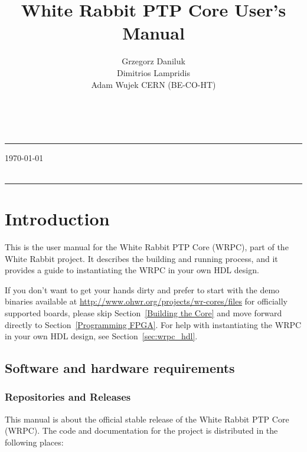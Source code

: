 \documentclass[a4paper, 12pt]{article}
\title{White Rabbit PTP Core User's Manual}
\author{Grzegorz Daniluk \\Dimitrios Lampridis \\Adam Wujek \hfill CERN (BE-CO-HT)}
\renewcommand{\_}{\underscore\allowbreak}
\begin{document}


\makeatletter
{}
\raggedright
{\LARGE\bf\@title}\\[0.2 cm]
\hrule height 4pt \vspace{0.1cm}
{\large\gitrevinfo\hfill\today}\\
\vspace*{\fill}
{\large\@author}\\
\hrule height 2pt
\justify
\makeatother

\newpage

\tableofcontents

\newpage

\section{Introduction}

This is the user manual for the White Rabbit PTP Core (WRPC), part of the White
Rabbit project. It describes the building and running process, and it provides a
guide to instantiating the WRPC in your own HDL design.

If you don't want to get your hands dirty and prefer to start with the demo binaries
available at \url{http://www.ohwr.org/projects/wr-cores/files} for officially
supported boards, please skip Section~\ref{Building the Core} and move forward
directly to Section~\ref{Programming FPGA}. For help with instantiating the WRPC in
your own HDL design, see Section~\ref{sec:wrpc_hdl}.


\subsection{Software and hardware requirements}
\label{Software and hardware requirements}

\subsubsection{Repositories and Releases}
\label{Repositories and Releases}

This manual is about the official \gitrevinfo{} stable release of the White
Rabbit PTP Core (WRPC).  The code and documentation for the project is
distributed in the following places:
\end{document}
